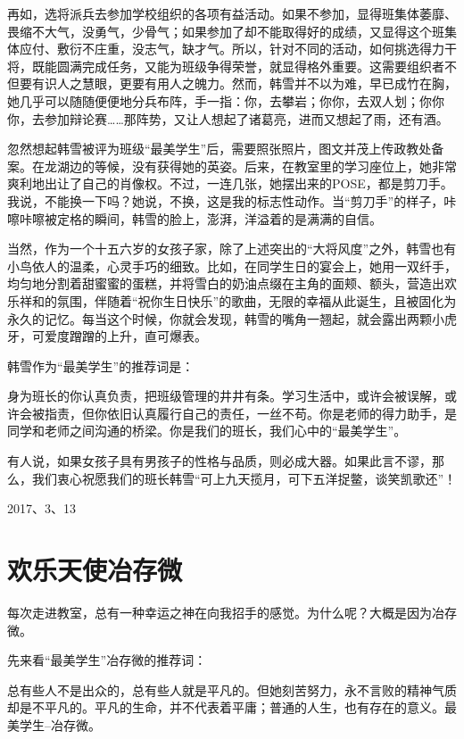 \documentclass[openany]{ctexbook}
\begin{document}
再如，选将派兵去参加学校组织的各项有益活动。如果不参加，显得班集体萎靡、畏缩不大气，没勇气，少骨气；如果参加了却不能取得好的成绩，又显得这个班集体应付、敷衍不庄重，没志气，缺才气。所以，针对不同的活动，如何挑选得力干将，既能圆满完成任务，又能为班级争得荣誉，就显得格外重要。这需要组织者不但要有识人之慧眼，更要有用人之魄力。然而，韩雪并不以为难，早已成竹在胸，她几乎可以随随便便地分兵布阵，手一指：你，去攀岩；你你，去双人划；你你你，去参加辩论赛\ldots{}\ldots{}那阵势，又让人想起了诸葛亮，进而又想起了雨，还有酒。

忽然想起韩雪被评为班级``最美学生''后，需要照张照片，图文并茂上传政教处备案。在龙湖边的等候，没有获得她的英姿。后来，在教室里的学习座位上，她非常爽利地出让了自己的肖像权。不过，一连几张，她摆出来的POSE，都是剪刀手。我说，不能换一下吗？她说，不换，这是我的标志性动作。当``剪刀手''的样子，咔嚓咔嚓被定格的瞬间，韩雪的脸上，澎湃，洋溢着的是满满的自信。

当然，作为一个十五六岁的女孩子家，除了上述突出的``大将风度''之外，韩雪也有小鸟依人的温柔，心灵手巧的细致。比如，在同学生日的宴会上，她用一双纤手，均匀地分割着甜蜜蜜的蛋糕，并将雪白的奶油点缀在主角的面颊、额头，营造出欢乐祥和的氛围，伴随着``祝你生日快乐''的歌曲，无限的幸福从此诞生，且被固化为永久的记忆。每当这个时候，你就会发现，韩雪的嘴角一翘起，就会露出两颗小虎牙，可爱度蹭蹭的上升，直可爆表。

韩雪作为``最美学生''的推荐词是：

身为班长的你认真负责，把班级管理的井井有条。学习生活中，或许会被误解，或许会被指责，但你依旧认真履行自己的责任，一丝不苟。你是老师的得力助手，是同学和老师之间沟通的桥梁。你是我们的班长，我们心中的``最美学生''。

有人说，如果女孩子具有男孩子的性格与品质，则必成大器。如果此言不谬，那么，我们衷心祝愿我们的班长韩雪``可上九天揽月，可下五洋捉鳖，谈笑凯歌还''！

2017、3、13

\chapter*{欢乐天使冶存微}\label{yecunwei}

每次走进教室，总有一种幸运之神在向我招手的感觉。为什么呢？大概是因为冶存微。

先来看``最美学生''冶存微的推荐词：

总有些人不是出众的，总有些人就是平凡的。但她刻苦努力，永不言败的精神气质却是不平凡的。平凡的生命，并不代表着平庸；普通的人生，也有存在的意义。最美学生--冶存微。
\end{document}
